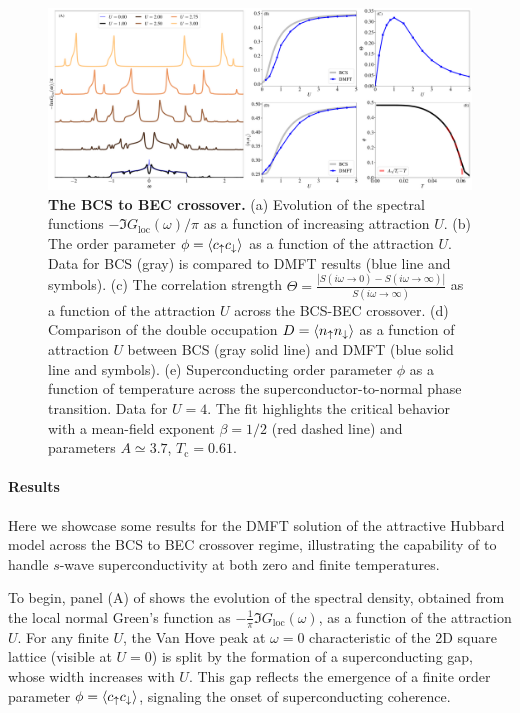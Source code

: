 \documentclass[edipack2.tex]{subfiles}
\begin{document}
\begin{figure}[t!]
  \includegraphics[width=\linewidth]{figures/figAHM.pdf}
    \caption{\label{figEx2}%
      \textbf{The BCS to BEC crossover.}
      (a) Evolution of the spectral functions
      $-\Im{G_\mathrm{loc}(\omega)}/\pi$ as a function of increasing
      attraction $U$. 
      (b) The order parameter $\phi=\langle c_\uparrow c_\downarrow\rangle$ as a
      function of the attraction $U$. Data for BCS (gray) is compared
      to DMFT results (blue line and symbols). 
      (c) The correlation strength
      $\Theta=\frac{|S(i\omega\to0)-S(i\omega\to\infty)|}{S(i\omega\to\infty)}$ as a function of the
      attraction $U$ across the BCS-BEC crossover. 
      (d) Comparison of the double occupation $D=\langle n_\uparrow
      n_\downarrow\rangle$ as a function of attraction $U$ between BCS (gray
      solid line) and DMFT (blue solid line and symbols). 
      (e) Superconducting order
      parameter $\phi$ as a function of temperature across the
      superconductor-to-normal phase transition. Data for $U=4$. The
      fit highlights the critical behavior with a mean-field exponent
      $\beta=1/2$ (red dashed line) and parameters $A\simeq 3.7$, $T_\mathrm{c}=0.61$.       
        }
\end{figure}

\paragraph{Results}
Here we showcase some results for the DMFT solution of the 
attractive Hubbard model across the BCS to BEC crossover regime, 
illustrating the capability of \NAME to handle $s$-wave 
superconductivity at both zero and finite temperatures.

To begin, panel (A) of  shows the evolution of the 
spectral density, obtained from the local normal Green's function as 
$-\tfrac{1}{\pi}\Im G_\mathrm{loc}(\omega)$, as a function of the 
attraction $U$. For any finite $U$, the Van Hove peak at 
$\omega = 0$ characteristic of the 2D square lattice (visible at 
$U = 0$) is split by the formation of a superconducting gap, whose 
width increases with $U$. This gap reflects the emergence of a finite 
order parameter $\phi = \langle c_\uparrow c_\downarrow \rangle$, signaling the 
onset of superconducting coherence.
\end{document}
